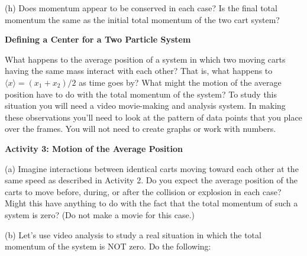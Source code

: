 (h) Does momentum appear to be conserved in each case? Is the final total momentum
the same as the initial total momentum of the two cart system?
\vspace{20mm}

\textbf{Defining a Center for a Two Particle System }

What happens to the average position of a system in which two moving carts having
the same mass interact with each other? That is, what happens to 
\(\langle x\rangle = (x_{1} 
+ x_{2} )/2\) as time goes by? What might the motion of the average position
have to do with the total momentum of the system? To study this situation you
will need a video movie-making and analysis system. In making these observations
you'll need to look at the pattern of data points that you place over the frames.
You will not need to create graphs or work with numbers. 

\textbf{Activity 3: Motion of the Average Position} 

(a) Imagine interactions between identical carts moving toward each other at
the same speed as described in Activity 2. Do you expect the average position
of the carts to move before, during, or after the collision or explosion in
each case? Might this have anything to do with the fact that the total momentum
of such a system is zero? (Do not make a movie for this case.)
\vspace{20mm}

(b) Let's use video analysis to study a real situation in which the total momentum of the system is NOT zero. Do the following: 

